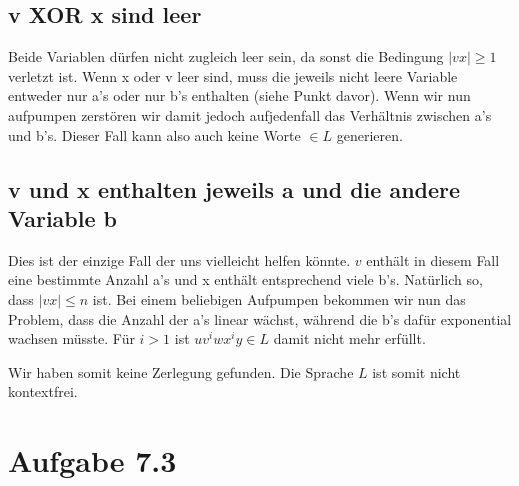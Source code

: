 \documentclass{article}
\begin{document}
\subsection*{v XOR x sind leer}
Beide Variablen dürfen nicht zugleich leer sein, da sonst die Bedingung $|vx|\geq 1$ verletzt ist. Wenn x oder v leer sind, muss die jeweils nicht leere Variable entweder nur a's oder nur b's enthalten (siehe Punkt davor). Wenn wir nun aufpumpen zerstören wir damit jedoch aufjedenfall das Verhältnis zwischen a's und b's. Dieser Fall kann also auch keine Worte $\in L$ generieren.

\subsection*{v und x enthalten jeweils a und die andere Variable b}
Dies ist der einzige Fall der uns vielleicht helfen könnte. $v$ enthält in diesem Fall eine bestimmte Anzahl a's und x enthält entsprechend viele b's. Natürlich so, dass $|vx| \leq n$ ist. Bei einem beliebigen Aufpumpen bekommen wir nun das Problem, dass die Anzahl der a's linear wächst, während die b's dafür exponential wachsen müsste. Für $i>1$ ist $uv^iwx^iy\in L$ damit nicht mehr erfüllt.

\bigskip

Wir haben somit keine Zerlegung gefunden. Die Sprache $L$ ist somit nicht kontextfrei.


\section*{Aufgabe 7.3}
\end{document}
